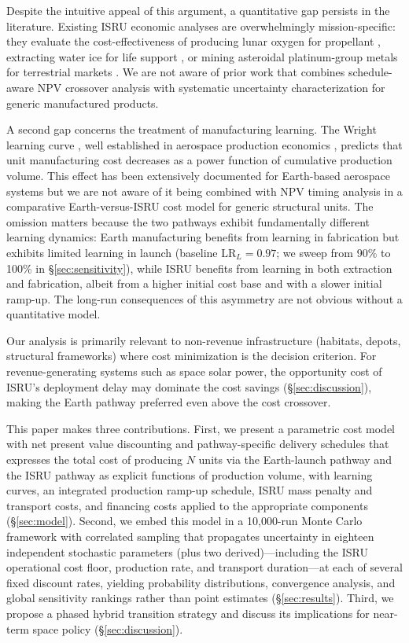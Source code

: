 \documentclass[5p,twocolumn]{elsarticle}
\begin{document}
Despite the intuitive appeal of this argument, a quantitative gap persists in the literature. Existing ISRU economic analyses are overwhelmingly mission-specific: they evaluate the cost-effectiveness of producing lunar oxygen for propellant \cite{sanders2015}, extracting water ice for life support \cite{zubrin1996}, or mining asteroidal platinum-group metals for terrestrial markets \cite{sonter1997,elvis2012}. We are not aware of prior work that combines schedule-aware NPV crossover analysis with systematic uncertainty characterization for generic manufactured products.

A second gap concerns the treatment of manufacturing learning. The Wright learning curve \cite{wright1936}, well established in aerospace production economics \cite{wertz2011}, predicts that unit manufacturing cost decreases as a power function of cumulative production volume. This effect has been extensively documented for Earth-based aerospace systems \cite{argote1990,nagy2013} but we are not aware of it being combined with NPV timing analysis in a comparative Earth-versus-ISRU cost model for generic structural units. The omission matters because the two pathways exhibit fundamentally different learning dynamics: Earth manufacturing benefits from learning in fabrication but exhibits limited learning in launch (baseline $\mathrm{LR}_L = 0.97$; we sweep from 90\% to 100\% in \S\ref{sec:sensitivity}), while ISRU benefits from learning in both extraction and fabrication, albeit from a higher initial cost base and with a slower initial ramp-up. The long-run consequences of this asymmetry are not obvious without a quantitative model.

Our analysis is primarily relevant to non-revenue infrastructure (habitats, depots, structural frameworks) where cost minimization is the decision criterion. For revenue-generating systems such as space solar power, the opportunity cost of ISRU's deployment delay may dominate the cost savings (\S\ref{sec:discussion}), making the Earth pathway preferred even above the cost crossover.

This paper makes three contributions. First, we present a parametric cost model with net present value discounting and pathway-specific delivery schedules that expresses the total cost of producing $N$ units via the Earth-launch pathway and the ISRU pathway as explicit functions of production volume, with learning curves, an integrated production ramp-up schedule, ISRU mass penalty and transport costs, and financing costs applied to the appropriate components (\S\ref{sec:model}). Second, we embed this model in a 10{,}000-run Monte Carlo framework with correlated sampling that propagates uncertainty in eighteen independent stochastic parameters (plus two derived)---including the ISRU operational cost floor, production rate, and transport duration---at each of several fixed discount rates, yielding probability distributions, convergence analysis, and global sensitivity rankings rather than point estimates (\S\ref{sec:results}). Third, we propose a phased hybrid transition strategy and discuss its implications for near-term space policy (\S\ref{sec:discussion}).
\end{document}
